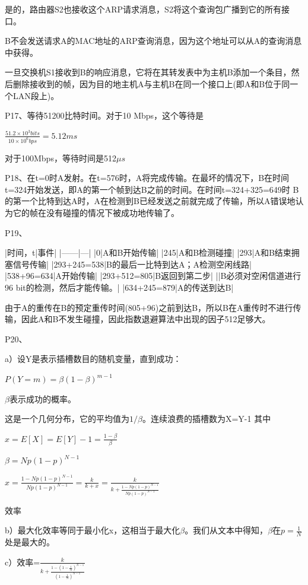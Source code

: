 \documentclass[11pt,UTF8,twoside]{article}
\begin{document}
{		是的，路由器S2也接收这个ARP请求消息，S2将这个查询包广播到它的所有接口。
		
		B不会发送请求A的MAC地址的ARP查询消息，因为这个地址可以从A的查询消息中获得。
		
		一旦交换机S1接收到B的响应消息，它将在其转发表中为主机B添加一个条目，然后删除接收到的帧，因为目的地主机A与主机B在同一个接口上(即A和B位于同一个LAN段上)。
		
		P17、等待51200比特时间。对于10 Mbps，这个等待是
		
		$\frac{51.2\times 10^3 bits}{10\times 10^6 bps}=5.12ms$
		
		对于100Mbps，等待时间是512$\mu s$
		
		P18、在t=0时A发射。在t=576时，A将完成传输。在最坏的情况下，B在时间t=324开始发送，即A的第一个帧到达B之前的时间。在时间t=324+325=649时 B的第一个比特到达A时，A在检测到B已经发送之前就完成了传输，所以A错误地认为它的帧在没有碰撞的情况下被成功地传输了。
		
		P19、
		
		|时间，t|事件|
		|------|---|
		|0|A和B开始传输|
		|245|A和B检测碰撞|
		|293|A和B结束拥塞信号传输|
		|293+245=538|B的最后一比特到达A；A检测空闲线路|
		|538+96=634|A开始传输|
		|293+512=805|B返回到第二步|
		||B必须对空闲信道进行96 bit的检测，然后才能传输。|
		|634+245=879|A的传送到达B|
		
		由于A的重传在B的预定重传时间(805+96)之前到达B，所以B在A重传时不进行传输，因此A和B不发生碰撞，因此指数退避算法中出现的因子512足够大。
		
		P20、
		
		a）设Y是表示插槽数目的随机变量，直到成功：
		
		$P\left ( Y=m \right )=\beta \left ( 1-\beta \right )^{m-1}$
		
		$\beta$表示成功的概率。
		
		这是一个几何分布，它的平均值为$1/\beta$。连续浪费的插槽数为X=Y-1 其中
		
		$x=E[X]=E[Y]-1=\frac{1-\beta}{\beta}$
		
		$\beta = Np\left ( 1-p \right )^{N-1}$
		
		$x=\frac{1-Np(1-p)^{N-1}}{Np(1-p)^{N-1}}=\frac{k}{k+x}=\frac{k}{k+\frac{1-Np(1-p)^{N-1}}{Np(1-p)^{N-1}}}$
		
		效率
		
		b）最大化效率等同于最小化x，这相当于最大化$\beta$。我们从文本中得知，$\beta$在$p=\frac{1}{N}$处是最大的。
		
		c）效率=$\frac{k}{k+\frac{1-(1-\frac{1}{N})^{N-1}}{(1-\frac{1}{N})^{N-1}}}$
		
}
\end{document}

